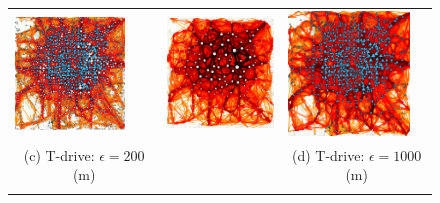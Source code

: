 \begin{figure}[!htb]
\begin{tabular}{ccccc}
\includegraphics[width=35mm]{pics/tdrive200with.eps}&
~~&
\includegraphics[width=35mm]{pics/tdrive1000without.eps}&
\includegraphics[width=35mm]{pics/tdrive1000with2.eps}\\
\multicolumn{2}{c}{(c) T-drive: $\epsilon = 200$ (m)} & & \multicolumn{2}{c}{(d) T-drive: $\epsilon = 1000$ (m)}\\
\multicolumn{5}{c}{
\begin{minipage}[b]{138mm}\centering


\end{minipage}}
\end{tabular}
\end{figure}
